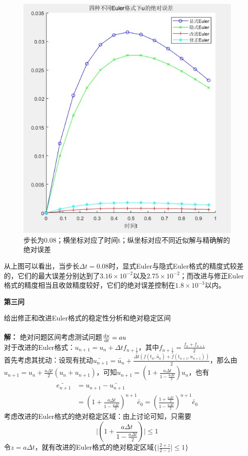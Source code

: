 \documentclass[12pt]{article}
\begin{document}
\begin{figure}[H]
	\centering
	\includegraphics[width=1\textwidth]{2}
	\caption{步长为0.08；横坐标对应了时间t；纵坐标对应不同近似解与精确解的绝对误差}
\end{figure}
从上图可以看出，当步长$\Delta{t}=0.08$时，显式Euler与隐式Euler格式的精度式较差的，它们的最大误差分别达到了$3.16\times10^{-2}$以及$2.75\times10^{-2}$；而改进与修正Euler格式的精度相当且收敛精度较好，它们的绝对误差控制在$1.8\times10^{-3}$以内。\\


\begin{center}
	\textbf{第三问}
\end{center}
给出修正和改进Euler格式的稳定性分析和绝对稳定区间\\
\\
\textbf{解：}
绝对问题区间考虑测试问题$\frac{{\rm d}u}{{\rm d}t}=au$\\
对于改进的Euler格式：$u_{n+1}=u_n+\Delta{t}f_{n+\frac{1}{2}}$，其中$f_{n+\frac{1}{2}}=\frac{f_n+f_{n+1}}{2}$\\
首先考虑其扰动：设现有扰动$\widetilde{u_{n+1}}=\widetilde{u_n}+\frac{\Delta{t}(f(t_n,\widetilde{u_n})+f(t_{n+1},\widetilde{u_{n+1}}))}{2}$，那么由$u_{n+1}=u_n+\frac{a\Delta{t}}{2}(u_n+u_{n+1})$，可知$u_{n+1}=(1+\frac{a\Delta{t}}{1-\frac{a\Delta{t}}{2}})u_n$，也有
\begin{align*}
	{\widetilde{e_{n+1}}}&= u_{n+1}-\widetilde{u_{n+1}}  \\
	&=(1+\frac{a\Delta{t}}{1-\frac{a\Delta{t}}{2}})^{n+1} \widetilde{e_0}=(\frac{1+\frac{a\Delta{t}}{2}}{1-\frac{a\Delta{t}}{2}})^{n+1}\widetilde{e_0}
\end{align*}
考虑改进的Euler格式的绝对稳定区域：由上讨论可知，只需要$$\vert(1+\frac{a\Delta{t}}{1-\frac{a\Delta{t}}{2}})\vert\le1$$
令$z=a\Delta{t}$，就有改进的Euler格式的绝对稳定区域$\{ \vert\frac{2+z}{2-z}\vert \le1 \}$
\end{document}
